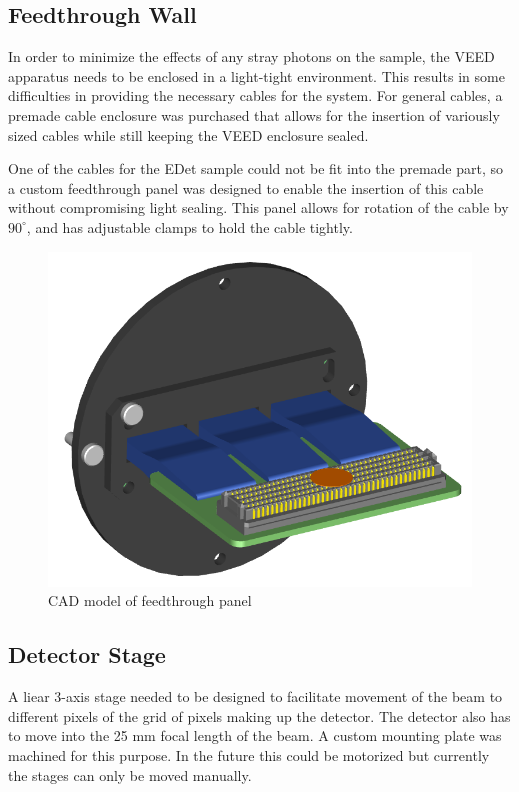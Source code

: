 \documentclass{article}
\begin{document}
    \subsection{Feedthrough Wall} \label{veed_wall}
    
    In order to minimize the effects of any stray photons on the sample, the VEED apparatus needs to be enclosed in a light-tight environment. This results in some difficulties in providing the necessary cables for the system. For general cables, a premade cable enclosure was purchased that allows for the insertion of variously sized cables while still keeping the VEED enclosure sealed.
    
    One of the cables for the EDet sample could not be fit into the premade part, so a custom feedthrough panel was designed to enable the insertion of this cable without compromising light sealing. This panel allows for rotation of the cable by $90^\circ$, and has adjustable clamps to hold the cable tightly.
    
    \begin{figure}[h]
        \centering
        \includegraphics[scale=0.3]{img/feedthrough_panel_cad}
        \caption{CAD model of feedthrough panel}
        \label{fig:feedthrough_panel_cad}
    \end{figure}
    
    \subsection{Detector Stage}
    
    A liear 3-axis stage needed to be designed to facilitate movement of the beam to different pixels of the grid of pixels making up the detector. The detector also has to move into the 25 mm focal length of the beam. A custom mounting plate was machined for this purpose. In the future this could be motorized but currently the stages can only be moved manually.
    
\end{document}
